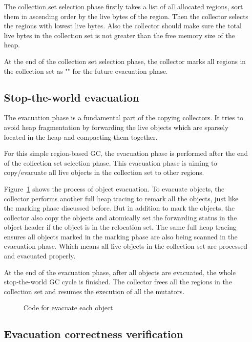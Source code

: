 The collection set selection phase firstly takes a list of all allocated regions,
sort them in ascending order by the live bytes of the region.
Then the collector selects the regions with lowest live bytes.
Also the collector should make sure the total live bytes in the collection set is not
greater than the free memory size of the heap.

At the end of the collection set selection phase, the collector marks all regions
in the collection set as "" for the future evacuation phase.

\subsection{Stop-the-world evacuation}

The evacuation phase is a fundamental part of the copying collectors.
It tries to avoid heap fragmentation by forwarding the live objects which are sparsely located in the heap
and compacting them together.

For this simple region-based GC, the evacuation phase is performed after the end of the collection set selection phase.
This evacuation phase is aiming to copy/evacuate all live objects in the collection set to other
regions.

Figure~\ref{fig:traceevacuateobject} shows the process of object evacuation.
To evacuate objects, the collector performs another full heap tracing to remark all the objects,
just like the marking phase discussed before.
But in addition to mark the objects, the collector also copy the objects and atomically set the forwarding status in the object header
if the object is in the relocation set.
The same full heap tracing ensures all objects marked in the marking phase are also being scanned in the evacuation phase.
Which means all live objects in the collection set are processed and evacuated properly.

At the end of the evacuation phase, after all objects are evacuated, the whole stop-the-world GC cycle is finished.
The collector frees all the regions in the collection set and resumes the execution of all the mutators.

\begin{figure}
  \centering
  
  \caption{Code for evacuate each object}
  \label{fig:traceevacuateobject}
\end{figure}

\subsection{Evacuation correctness verification}

